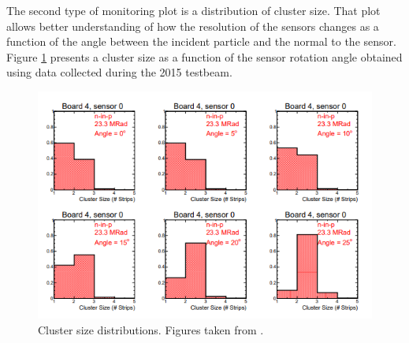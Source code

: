 The second type of monitoring plot is a distribution of cluster size. That plot allows better understanding of how the resolution of the sensors changes as a function of the angle between the incident particle and the normal to the sensor. Figure \ref{fig:clusters_size} presents a cluster size as a function of the sensor rotation angle obtained using data collected during the 2015 testbeam. 


\begin{figure}
\centering
\includegraphics{figures/Cluster_size.PNG}
\caption{Cluster size distributions. Figures taken from \cite{tb1}. 
}\label{fig:clusters_size}
\end{figure}

 
